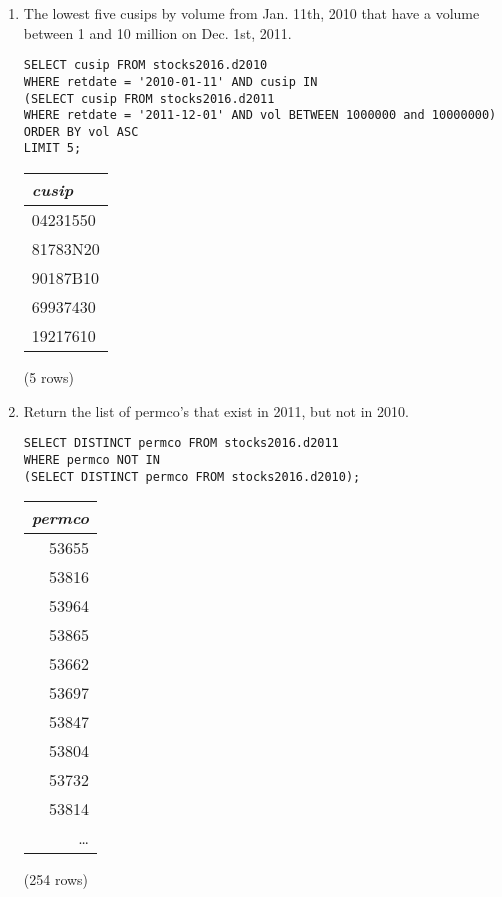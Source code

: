 \documentclass[]{article}
\newenvironment{question}[2][Question]{\begin{trivlist}
\item[\hskip \labelsep {\bfseries #1}\hskip \labelsep {\bfseries #2.}]}{\end{trivlist}}
\begin{document}
\begin{question}{1}
\begin{enumerate}[label=(\alph*)]
\item The lowest five cusips by volume from Jan. 11th, 2010 that have a volume between 1 and 10 million on Dec. 1st, 2011.
  \color{blue}
\begin{verbatim}
SELECT cusip FROM stocks2016.d2010
WHERE retdate = '2010-01-11' AND cusip IN
(SELECT cusip FROM stocks2016.d2011
WHERE retdate = '2011-12-01' AND vol BETWEEN 1000000 and 10000000)
ORDER BY vol ASC
LIMIT 5;
  \end{verbatim}
\color{black}

\begin{center}
\begin{tabular}{l}
\textit{cusip} \\
\hline
04231550 \\
81783N20 \\
90187B10 \\
69937430 \\
19217610 \\
\end{tabular}

\noindent (5 rows) \\
\end{center}

\item Return the list of permco's that exist in 2011, but not in 2010.
  \color{blue}
\begin{verbatim}
SELECT DISTINCT permco FROM stocks2016.d2011
WHERE permco NOT IN
(SELECT DISTINCT permco FROM stocks2016.d2010);
  \end{verbatim}
\color{black}

\begin{center}
\begin{tabular}{r}
\textit{permco} \\
\hline
53655 \\
53816 \\
53964 \\
53865 \\
53662 \\
53697 \\
53847 \\
53804 \\
53732 \\
53814 \\
\ldots \\
\end{tabular}

\noindent (254 rows) \\
\end{center}


\end{enumerate}
\end{question}
\end{document}
